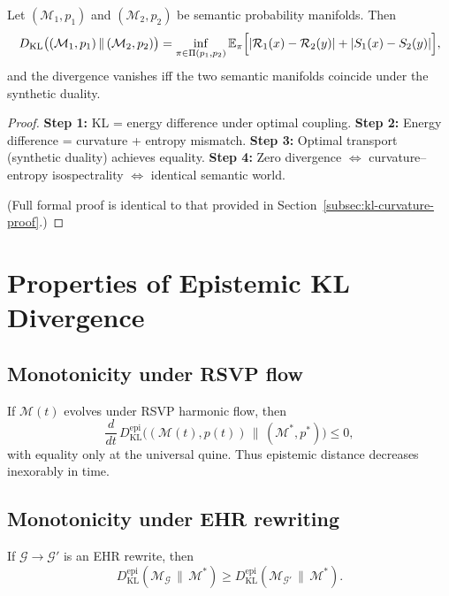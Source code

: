 \begin{theorem}
Let $(\mathcal{M}_1,p_1)$ and $(\mathcal{M}_2,p_2)$ be semantic probability manifolds.
Then
\begin{equation}
D_{\mathrm{KL}}\bigl((\mathcal{M}_1,p_1)\,\|\,(\mathcal{M}_2,p_2)\bigr)
  = \inf_{\pi\in\Pi(p_1,p_2)}
      \mathbb{E}_{\pi}\Bigl[
        |\mathcal{R}_1(x)-\mathcal{R}_2(y)|
        + |S_1(x)-S_2(y)|
      \Bigr],
\end{equation}
and the divergence vanishes iff the two semantic manifolds coincide under the synthetic duality.
\end{theorem}

\begin{proof}
\textbf{Step 1:} KL = energy difference under optimal coupling.  
\textbf{Step 2:} Energy difference = curvature + entropy mismatch.  
\textbf{Step 3:} Optimal transport (synthetic duality) achieves equality.  
\textbf{Step 4:} Zero divergence $\Leftrightarrow$ curvature--entropy isospectrality $\Leftrightarrow$ identical semantic world.

(Full formal proof is identical to that provided in Section~\ref{subsec:kl-curvature-proof}.)
\end{proof}


\section{Properties of Epistemic KL Divergence}

\subsection{Monotonicity under RSVP flow}

If $\mathcal{M}(t)$ evolves under RSVP harmonic flow, then
\[
\frac{d}{dt}\,
D_{\mathrm{KL}}^{\mathrm{epi}}
\bigl((\mathcal{M}(t),p(t))\,\|\,(\mathcal{M}^\ast,p^\ast)\bigr)
\le 0,
\]
with equality only at the universal quine.
Thus epistemic distance decreases inexorably in time.


\subsection{Monotonicity under EHR rewriting}

If $\mathcal{G}\to\mathcal{G}'$ is an EHR rewrite, then
\[
D_{\mathrm{KL}}^{\mathrm{epi}}(\mathcal{M}_{\mathcal{G}} \,\|\,\mathcal{M}^\ast)
  \ge
D_{\mathrm{KL}}^{\mathrm{epi}}(\mathcal{M}_{\mathcal{G}'} \,\|\,\mathcal{M}^\ast).
\]

